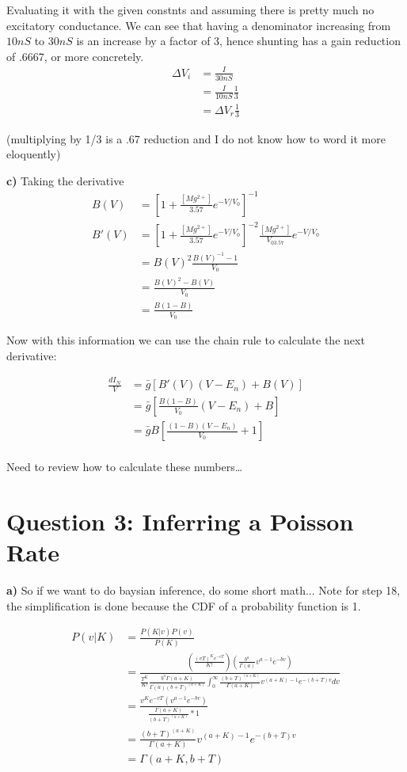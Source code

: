 \documentclass{article}
\begin{document}
Evaluating it with the given constnts and assuming there is pretty much no excitatory conductance.
We can see that having a denominator increasing from $10nS$ to $30nS$ is an increase by a factor of 3,
hence shunting has a gain reduction of .6667, or more concretely.
\begin{align}
    \Delta V_i &= \frac{I}{30 nS}\\
    &= \frac{I}{10 nS} \frac{1}{3}\\
    &= \Delta V_r \frac{1}{3}
\end{align}

(multiplying by 1/3 is a .67 reduction and I do not know how to word it more eloquently)

\textbf{c)} Taking the derivative
\begin{align}
    B(V) &= \left[1+ \frac{[Mg^{2+}]}{3.57}e^{-V/V_0}\right]^{-1}\\
    B'(V) &= \left[1+ \frac{[Mg^{2+}]}{3.57}e^{-V/V_0}\right]^{-2}\frac{[Mg^{2+}]}{V_03.57}e^{-V/V_0}\\
    &= B(V)^{2}\frac{B(V)^{-1}-1}{V_0}\\
    &= \frac{B(V)^{2}-B(V)}{V_0}\\
    &= \frac{B(1-B)}{V_0}
\end{align}

Now with this information we can use the chain rule to calculate the next derivative:

\begin{align}
    \frac{dI_N}{V} &= \bar{g}\left[B'(V)(V-E_n) + B(V)\right]\\
    &= \bar{g}\left[\frac{B(1-B)}{V_0}(V-E_n) + B\right]\\
    &= \bar{g}B\left[\frac{(1-B)(V-E_n)}{V_0} + 1\right]\\
\end{align}

Need to review how to calculate these numbers\dots


\section{Question 3: Inferring a Poisson Rate}

\textbf{a)} So if we want to do baysian inference, do some short math... Note for step 18,
the simplification is done because the CDF of a probability function is 1.

\begin{align}
    P(v|K) &= \frac{P(K|v)P(v)}{P(K)}\\
    &= \frac{ \left(\frac{(vT)^Ke^{-vT}}{K!}\right) \left(\frac{b^a}{\Gamma(a)}v^{a-1}e^{-bv}\right)}
    {
        \frac{T^K}{K!}
        \frac{b^a\Gamma(a+K)}{\Gamma(a)(b+T)^{(a+K)}}
        \int_{0}^{\infty} \frac{(b+T)^{(a+K)}}{\Gamma(a+K)} v^{(a+K)-1} e^{-(b+T)v}  dv
    }\\
    &=\frac{ v^Ke^{-vT} \left(v^{a-1}e^{-bv}\right)}
    {
        \frac{\Gamma(a+K)}{(b+T)^{(a+K)}}
        *1
    }\\
    &=\frac{(b+T)^{(a+K)}}{\Gamma(a+K)}v^{(a+K)-1}e^{-(b+T)v}\\
    &= \Gamma(a+K,b+T)
\end{align}
\end{document}
